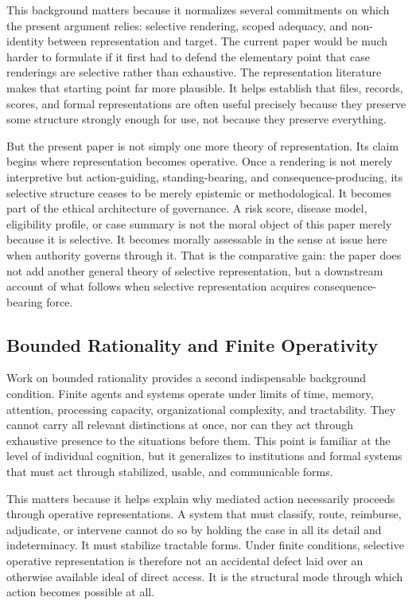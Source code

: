 \documentclass[11pt]{article}
\begin{document}
This background matters because it normalizes several commitments on which the present argument relies: selective rendering, scoped adequacy, and non-identity between representation and target. The current paper would be much harder to formulate if it first had to defend the elementary point that case renderings are selective rather than exhaustive. The representation literature makes that starting point far more plausible. It helps establish that files, records, scores, and formal representations are often useful precisely because they preserve some structure strongly enough for use, not because they preserve everything.

But the present paper is not simply one more theory of representation. Its claim begins where representation becomes operative. Once a rendering is not merely interpretive but action-guiding, standing-bearing, and consequence-producing, its selective structure ceases to be merely epistemic or methodological. It becomes part of the ethical architecture of governance. A risk score, disease model, eligibility profile, or case summary is not the moral object of this paper merely because it is selective. It becomes morally assessable in the sense at issue here when authority governs through it. That is the comparative gain: the paper does not add another general theory of selective representation, but a downstream account of what follows when selective representation acquires consequence-bearing force.

\subsection{Bounded Rationality and Finite Operativity}

Work on bounded rationality provides a second indispensable background condition. Finite agents and systems operate under limits of time, memory, attention, processing capacity, organizational complexity, and tractability. They cannot carry all relevant distinctions at once, nor can they act through exhaustive presence to the situations before them. This point is familiar at the level of individual cognition, but it generalizes to institutions and formal systems that must act through stabilized, usable, and communicable forms. \cite{Wheeler2024BoundedRationalitySEP,Simon1982ModelsBoundedRationality}

This matters because it helps explain why mediated action necessarily proceeds through operative representations. A system that must classify, route, reimburse, adjudicate, or intervene cannot do so by holding the case in all its detail and indeterminacy. It must stabilize tractable forms. Under finite conditions, selective operative representation is therefore not an accidental defect laid over an otherwise available ideal of direct access. It is the structural mode through which action becomes possible at all. \cite{Swanson2026ConstraintConditionDisclosure}
\end{document}
